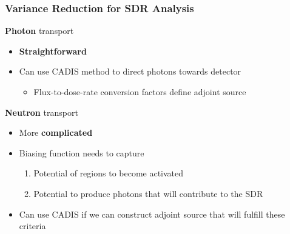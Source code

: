 \documentclass{beamer}
\begin{document}
\begin{frame}
\frametitle{Variance Reduction for SDR Analysis}
		\begin{block}{\textbf{Photon} transport}
  \begin{itemize}
  \item{\textbf{Straightforward}}
  \item{Can use CADIS method to direct photons towards detector}
    \begin{itemize}
    \item{Flux-to-dose-rate conversion factors define adjoint source}
    \end{itemize}
  \end{itemize}
	\end{block}
		\begin{block}{\textbf{Neutron} transport}
    \begin{itemize}
    \item{More \textbf{complicated}}
    \item{Biasing function needs to capture}
      \begin{enumerate}
        \item{Potential of regions to become activated}
        \item{Potential to produce photons that will contribute to the SDR}
      \end{enumerate}
    \item{Can use CADIS if we can construct adjoint source that will fulfill
	    these criteria}
    \end{itemize}
\end{block}
\end{frame}
\end{document}

